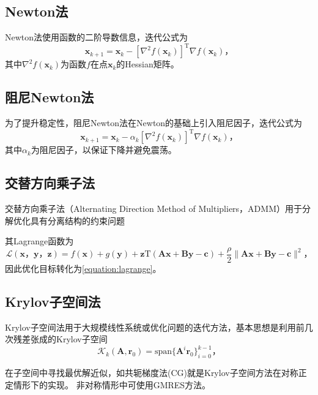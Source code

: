 \subsection{Newton法}

Newton法使用函数的二阶导数信息，迭代公式为
\begin{equation*}
    \bm{x}_{k+1}=\bm{x}_k-\left[\nabla^2f(\bm{x}_k)\right]^\mathrm{T}\nabla f(\bm{x}_k) \text{，}
\end{equation*}
其中$\nabla^2f(\bm{x}_k)$为函数$f$在点$\bm{x}_k$的Hessian矩阵。

\subsection{阻尼Newton法}

为了提升稳定性，阻尼Newton法在Newton的基础上引入阻尼因子，迭代公式为
\begin{equation*}
    \bm{x}_{k+1}=\bm{x}_k-\alpha_k\left[\nabla^2f(\bm{x}_k)\right]^\mathrm{T}\nabla f(\bm{x}_k) \text{，}
\end{equation*}
其中$\alpha_k$为阻尼因子，以保证下降并避免震荡。

\subsection{交替方向乘子法}

交替方向乘子法（Alternating Direction Method of Multipliers，ADMM）用于分解优化具有分离结构的约束问题

其Lagrange函数为
\begin{equation}
    \mathcal{L}(\bm{x} \text{，} \bm{y} \text{，} \bm{z})=f(\bm{x})+g(\bm{y})+\bm{z}\mathrm{T}(\bm{Ax}+\bm{By}-\bm{c})+\frac{\rho}{2}\|\bm{Ax}+\bm{By}-\bm{c}\|^2 \text{，}
    \label{equation:lagrange}
\end{equation}
因此优化目标转化为\cref{equation:lagrange}。

\subsection{Krylov子空间法}

Krylov子空间法用于大规模线性系统或优化问题的迭代方法，基本思想是利用前几次残差张成的Krylov子空间
\begin{equation*}
    \mathcal{K}_k(\bm{A}, \bm{r}_0)=\mathrm{span}\{\bm{A}^i\bm{r}_0\}_{i=0}^{k-1} \text{，}
\end{equation*}

在子空间中寻找最优解近似，如共轭梯度法(CG)就是Krylov子空间方法在对称正定情形下的实现。
非对称情形中可使用GMRES方法。
